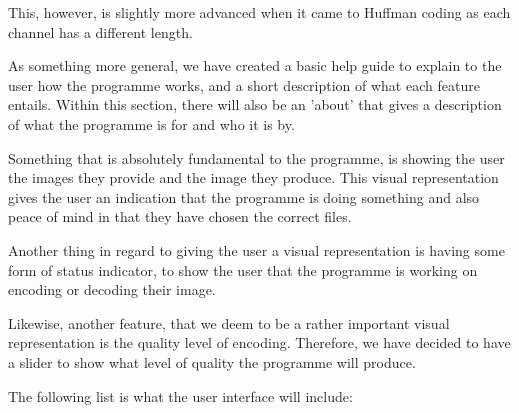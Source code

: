 This, however, is slightly more advanced when it came to Huffman coding as each channel has a different length.

As something more general, we have created a basic help guide to explain to the user how the programme works, and a short description of what each feature entails.
Within this section, there will also be an 'about' that gives a description of what the programme is for and who it is by.

Something that is absolutely fundamental to the programme, is showing the user the images they provide and the image they produce.
This visual representation gives the user an indication that the programme is doing something and also peace of mind in that they have chosen the correct files.

Another thing in regard to giving the user a visual representation is having some form of status indicator, to show the user that the programme is working on encoding or decoding their image.

Likewise, another feature, that we deem to be a rather important visual representation is the quality level of encoding.
Therefore, we have decided to have a slider to show what level of quality the programme will produce.

The following list is what the user interface will include:

